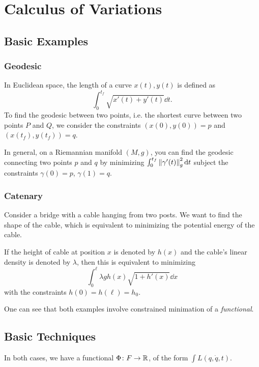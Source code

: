 \chapter{Calculus of Variations}

\section{Basic Examples}

\subsection*{Geodesic}

In Euclidean space, the length of a curve $x(t), y(t)$ is defined as \[\int_0^{t_f} \sqrt{x'(t) + y'(t)} \dd{t}.\] To find the geodesic between two points, i.e. the shortest curve between two points $P$ and $Q$, we consider the constraints $(x(0), y(0)) = p$ and $(x(t_f), y(t_f)) = q$.

In general, on a Riemannian manifold $(M, g)$, you can find the geodesic connecting two points $p$ and $q$ by minimizing $\int_0^{t_f} \norm{\gamma'(t)}_g^2 \dd{t}$ subject the constraints $\gamma(0) = p$, $\gamma(1) = q$.

\subsection*{Catenary}

Consider a bridge with a cable hanging from two posts. We want to find the shape of the cable, which is equivalent to minimizing the potential energy of the cable.

If the height of cable at position $x$ is denoted by $h(x)$ and the cable's linear density is denoted by $\lambda$, then this is equivalent to minimizing \[\int_0^\ell \lambda g h(x)\sqrt{1 + h'(x)} \dd{x}\] with the constraints $h(0) = h(\ell) = h_0$.

One can see that both examples involve constrained minimation of a \textit{functional}.

\section{Basic Techniques}

In both cases, we have a functional $\Phi \colon F \to \mathbb R$, of the form $\int L(q, \dot q, t)$.